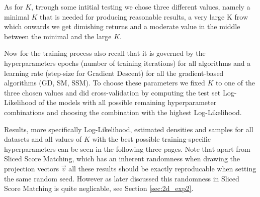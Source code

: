 As for $K$, trrough some intitial testing we chose three different values, namely a minimal $K$ that is needed for producing reasonable results, 
a very large K frow which onwards we get dimishing returns and a moderate value in the middle between the minimal and the large $K$.

Now for the training process also recall that it is governed by the hyperparameters epochs (number of training iterations) for all algorithms and 
a learning rate (step-size for Gradient Descent) for all the gradient-based algorithms (GD, SM, SSM).
To choose these parameters we fixed $K$ to one of the three chosen values and did cross-validation by computing the test set Log-Likelihood 
of the models with all possible remaining hyperparameter combinations and choosing the combination with the highest Log-Likelihood.

Results, more specifically Log-Likelihood, estimated densities and samples for all datasets and all values of $K$ with the best possible training-specific 
hyperparameters can be seen in the following three pages. Note that apart from Sliced Score Matching, which has an inherent randomness when drawing the projection vectors $\vec v$ all these results should be 
exactly reproducable when setting the same random seed. However as later discussed this randomness in Sliced Score Matching is quite neglicable, see Section \ref{sec:2d_exp2}.

